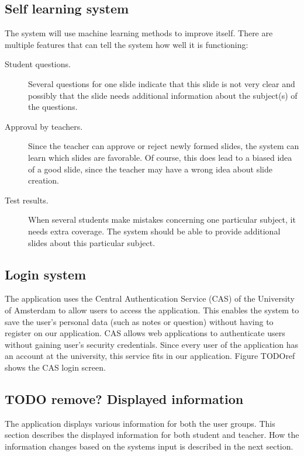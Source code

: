 \documentclass[11pt]{article}
\begin{document}
\subsection{Self learning system}
The system will use machine learning methods to improve itself. There are multiple features that can tell the system how well it is functioning:
\begin{description}
\item[Student questions.] Several questions for one slide indicate that this slide is not very clear and possibly that the slide needs additional information about the subject(s) of the questions. 
\item[Approval by teachers.] Since the teacher can approve or reject newly formed slides, the system can learn which slides are favorable. Of course, this does lead to a biased idea of a good slide, since the teacher may have a wrong idea about slide creation. 
\item[Test results.] When several students make mistakes concerning one particular subject, it needs extra coverage. The system should be able to provide additional slides about this particular subject.
\end{description}

\subsection{Login system}
The application uses the Central Authentication Service (CAS) of the University of Amsterdam to allow users to access the application. This enables the system to save the user's personal data (such as notes or question) without having to register on our application. CAS allows web applications to authenticate users without gaining user's security credentials. Since every user of the application has an account at the university, this service fits in our application. Figure TODOref shows the CAS login screen.

\subsection{TODO remove? Displayed information}
The application displays various information for both the user groups. This section describes the displayed information for both student and teacher. How the information changes based on the systems input is described in the next section. 
\end{document}
